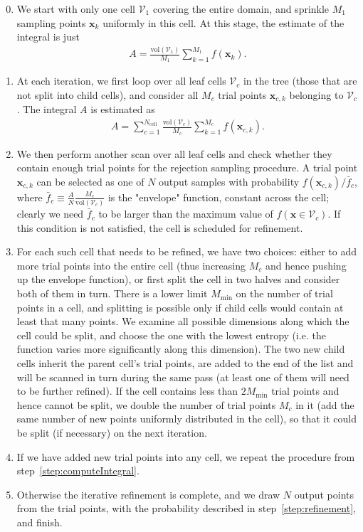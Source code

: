 \documentclass[12pt]{article}
\newcommand{\bx}{\boldsymbol{x}}
\begin{document}
\begin{enumerate}  \setcounter{enumi}{-1} \setlength{\parskip}{2pt} \setlength{\itemsep}{2pt}
\item We start with only one cell $\mathcal{V}_1$ covering the entire domain, and sprinkle $M_1$ sampling points $\bx_k$ uniformly in this cell. At this stage, the estimate of the integral is just
\begin{align}
A = \frac{\mathrm{vol}(\mathcal{V}_1)}{M_1} \sum_{k=1}^{M_1} f(\bx_k).
\end{align}
\item \label{step:computeIntegral}
At each iteration, we first loop over all leaf cells $\mathcal{V}_c$ in the tree (those that are not split into child cells), and consider all $M_c$ trial points $\bx_{c,k}$ belonging to $\mathcal{V}_c$. The integral $A$ is estimated as \begin{align}
A = \sum_{c=1}^{N_\mathrm{cell}} \frac{\mathrm{vol}(\mathcal{V}_c)}{M_c} \sum_{k=1}^{M_c} f(\bx_{c,k}).
\end{align}
\item \label{step:refinement} We then perform another scan over all leaf cells and check whether they contain enough trial points for the rejection sampling procedure. A trial point $\bx_{c,k}$ can be selected as one of $N$ output samples with probability $f(\bx_{c,k}) / \bar f_c$, where $\bar f_c \equiv \frac{A}{N} \frac{M_c}{\mathrm{vol}(\mathcal{V}_c)}$ is the "envelope" function, constant across the cell; clearly we need $\bar f_c$ to be larger than the maximum value of $f(\bx\in\mathcal{V}_c)$. If this condition is not satisfied, the cell is scheduled for refinement.
\item For each such cell that needs to be refined, we have two choices: either to add more trial points into the entire cell (thus increasing $M_c$ and hence pushing up the envelope function), or first split the cell in two halves and consider both of them in turn. There is a lower limit $M_\mathrm{min}$ on the number of trial points in a cell, and splitting is possible only if child cells would contain at least that many points. We examine all possible dimensions along which the cell could be split, and choose the one with the lowest entropy (i.e. the function varies more significantly along this dimension). The two new child cells inherit the parent cell's trial points, are added to the end of the list and will be scanned in turn during the same pass (at least one of them will need to be further refined). If the cell contains less than $2M_\mathrm{min}$ trial points and hence cannot be split, we double the number of trial points $M_c$ in it (add the same number of new points uniformly distributed in the cell), so that it could be split (if necessary) on the next iteration.
\item If we have added new trial points into any cell, we repeat the procedure from step~\ref{step:computeIntegral}. 
\item Otherwise the iterative refinement is complete, and we draw $N$ output points from the trial points, with the probability described in step~\ref{step:refinement}, and finish.
\end{enumerate}
\end{document}
